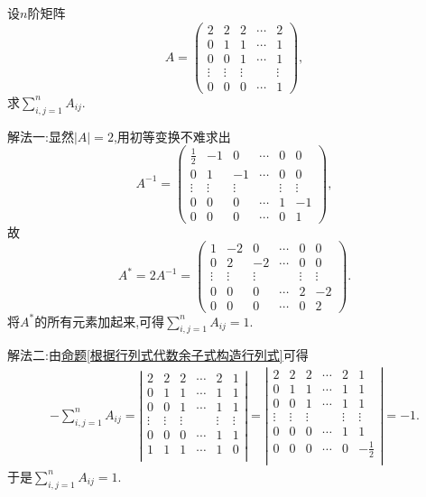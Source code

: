 \documentclass[../../main.tex]{subfiles}%
\begin{document}
\begin{example}
设\(n\)阶矩阵
\[
A = 
\begin{pmatrix}
2 & 2 & 2 & \cdots & 2 \\
0 & 1 & 1 & \cdots & 1 \\
0 & 0 & 1 & \cdots & 1 \\
\vdots & \vdots & \vdots & & \vdots \\
0 & 0 & 0 & \cdots & 1
\end{pmatrix},
\]
求\(\sum_{i,j = 1}^{n} A_{ij}\).
\end{example}
\begin{solution}

{\color{blue}解法一:}显然\(\vert A\vert = 2\),用初等变换不难求出
\[
A^{-1} = 
\begin{pmatrix}
\frac{1}{2} & -1 & 0 & \cdots & 0 & 0 \\
0 & 1 & -1 & \cdots & 0 & 0 \\
\vdots & \vdots & \vdots & & \vdots & \vdots \\
0 & 0 & 0 & \cdots & 1 & -1 \\
0 & 0 & 0 & \cdots & 0 & 1
\end{pmatrix},
\]
故
\[
A^* = 2A^{-1} = 
\begin{pmatrix}
1 & -2 & 0 & \cdots & 0 & 0 \\
0 & 2 & -2 & \cdots & 0 & 0 \\
\vdots & \vdots & \vdots & & \vdots & \vdots \\
0 & 0 & 0 & \cdots & 2 & -2 \\
0 & 0 & 0 & \cdots & 0 & 2
\end{pmatrix}.
\]
将\(A^*\)的所有元素加起来,可得\(\sum_{i,j = 1}^{n} A_{ij} = 1\).

{\color{blue}解法二:}由\hyperref[根据行列式代数余子式构造行列式]{命题\ref{根据行列式代数余子式构造行列式}}可得
\begin{align*}
-\sum_{i,j=1}^n{A_{ij}}=\left| \begin{matrix}
2&		2&		2&		\cdots&		2&		1\\
0&		1&		1&		\cdots&		1&		1\\
0&		0&		1&		\cdots&		1&		1\\
\vdots&		\vdots&		\vdots&		&		\vdots&		\vdots\\
0&		0&		0&		\cdots&		1&		1\\
1&		1&		1&		\cdots&		1&		0\\
\end{matrix} \right|=\left| \begin{matrix}
2&		2&		2&		\cdots&		2&		1\\
0&		1&		1&		\cdots&		1&		1\\
0&		0&		1&		\cdots&		1&		1\\
\vdots&		\vdots&		\vdots&		&		\vdots&		\vdots\\
0&		0&		0&		\cdots&		1&		1\\
0&		0&		0&		\cdots&		0&		-\frac{1}{2}\\
\end{matrix} \right|=-1.
\end{align*}
于是$\sum_{i,j=1}^n{A_{ij}}=1$.


\end{solution}
\end{document}
